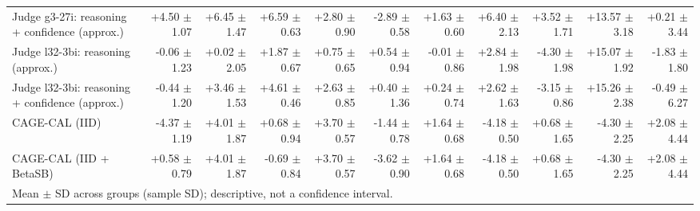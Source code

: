 \begin{tabular}{lrrrrrrrrrr}
Judge g3-27i: reasoning + confidence (approx.) & +4.50 {\scriptsize $\pm$ 1.07} & +6.45 {\scriptsize $\pm$ 1.47} & +6.59 {\scriptsize $\pm$ 0.63} & +2.80 {\scriptsize $\pm$ 0.90} & -2.89 {\scriptsize $\pm$ 0.58} & +1.63 {\scriptsize $\pm$ 0.60} & +6.40 {\scriptsize $\pm$ 2.13} & +3.52 {\scriptsize $\pm$ 1.71} & +13.57 {\scriptsize $\pm$ 3.18} & +0.21 {\scriptsize $\pm$ 3.44} \\
Judge l32-3bi: reasoning (approx.) & -0.06 {\scriptsize $\pm$ 1.23} & +0.02 {\scriptsize $\pm$ 2.05} & +1.87 {\scriptsize $\pm$ 0.67} & +0.75 {\scriptsize $\pm$ 0.65} & +0.54 {\scriptsize $\pm$ 0.94} & -0.01 {\scriptsize $\pm$ 0.86} & +2.84 {\scriptsize $\pm$ 1.98} & -4.30 {\scriptsize $\pm$ 1.98} & +15.07 {\scriptsize $\pm$ 1.92} & -1.83 {\scriptsize $\pm$ 1.80} \\
Judge l32-3bi: reasoning + confidence (approx.) & -0.44 {\scriptsize $\pm$ 1.20} & +3.46 {\scriptsize $\pm$ 1.53} & +4.61 {\scriptsize $\pm$ 0.46} & +2.63 {\scriptsize $\pm$ 0.85} & +0.40 {\scriptsize $\pm$ 1.36} & +0.24 {\scriptsize $\pm$ 0.74} & +2.62 {\scriptsize $\pm$ 1.63} & -3.15 {\scriptsize $\pm$ 0.86} & +15.26 {\scriptsize $\pm$ 2.38} & -0.49 {\scriptsize $\pm$ 6.27} \\
CAGE-CAL (IID) & -4.37 {\scriptsize $\pm$ 1.19} & +4.01 {\scriptsize $\pm$ 1.87} & +0.68 {\scriptsize $\pm$ 0.94} & +3.70 {\scriptsize $\pm$ 0.57} & -1.44 {\scriptsize $\pm$ 0.78} & +1.64 {\scriptsize $\pm$ 0.68} & -4.18 {\scriptsize $\pm$ 0.50} & +0.68 {\scriptsize $\pm$ 1.65} & -4.30 {\scriptsize $\pm$ 2.25} & +2.08 {\scriptsize $\pm$ 4.44} \\
CAGE-CAL (IID + BetaSB) & +0.58 {\scriptsize $\pm$ 0.79} & +4.01 {\scriptsize $\pm$ 1.87} & -0.69 {\scriptsize $\pm$ 0.84} & +3.70 {\scriptsize $\pm$ 0.57} & -3.62 {\scriptsize $\pm$ 0.90} & +1.64 {\scriptsize $\pm$ 0.68} & -4.18 {\scriptsize $\pm$ 0.50} & +0.68 {\scriptsize $\pm$ 1.65} & -4.30 {\scriptsize $\pm$ 2.25} & +2.08 {\scriptsize $\pm$ 4.44} \\
\bottomrule
\multicolumn{11}{l}{\scriptsize Mean $\pm$ SD across groups (sample SD); descriptive, not a confidence interval.} \\
\end{tabular}

